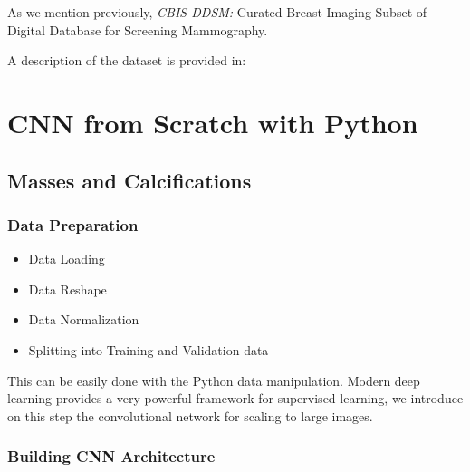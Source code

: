 \documentclass{book}
\begin{document}
    
    As we mention previously,  \textit{CBIS DDSM:} Curated Breast Imaging Subset of Digital Database for Screening Mammography.

    A description of the dataset is provided in:


    \chapter{CNN from Scratch with Python}
    
        \section{Masses and Calcifications} %

            \subsection{Data Preparation}

            \begin{itemize}
                \item Data Loading
                \item Data Reshape
                \item Data Normalization
                \item Splitting into Training and Validation data
            \end{itemize}

            This can be easily done with the Python data manipulation. Modern deep learning provides a very powerful framework for supervised learning, we introduce on this step the convolutional network for scaling to large images.

            \subsection{Building CNN Architecture}
\end{document}
